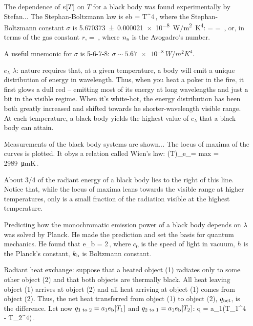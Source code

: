 The dependence of $e\!\left[{T}\right]$ on $T$ for a black body was found experimentally by Stefan... The Stephan-Boltzmann law is
\beq
e\txt b = \sigma T^4\,,
\eeq
where the Stephan-Boltzmann constant $\sigma$ is \SI{5.670373(21)e-8}{W/m^2K^4}:
\beq
\sigma = \qquad{}\qquad
\dim\sigma = \,,
\eeq
or, in terms of the gas constant $r$,
\beq
\sigma = \,,
\eeq
where $n_\text{a}$ is the Avogadro's number.

A useful mnemonic for $\sigma$ is 5-6-7-8: $\sigma \sim \SI{5.67e-8}{W/m^2K^4}$.

$e_\lambda$ \vs $\lambda$: nature requires that, at a given temperature, a body will emit a unique distribution of energy in wavelength. Thus, when you heat a poker in the fire, it first glows a dull red -- emitting most of its energy at long wavelengths and just a bit in the visible regime. When it's white-hot, the energy distribution has been both greatly increased and shifted towards he shorter-wavelength visible range. At each temperature, a black body yields the highest value of $e_\lambda$ that a black body can attain.

Measurements of the black body systems are shown... The locus of maxima of the curves is plotted. It obys a relation called Wien's law:
\beq
(\lambda T)_{e_\lambda = max} = \SI{2989}{\micro mK}\,.
\eeq

About 3/4 of the radiant energy of a black body lies to the right of this line. Notice that, while the locus of maxima leans towards the visible range at higher temperatures, only is a small fraction of the radiation visible at the highest temperature.

Predicting how the monochromatic emission power of a black body depends on $\lambda$ was solved by Planck. He made the prediction and set the basis for quantum mechanics. He found that
\beq
e_{\lambda\txt b} = 2\pi{}\,,
\eeq
where $c_0$ is the speed of light in vacuum, $h$ is the Planck's constant, $k_\text{b}$ is Boltzmann constant.

Radiant heat exchange: suppose that a heated object (1) radiates only to some other object (2) and that both objects are thermally black. All heat leaving object (1) arrives at object (2) and all heat arriving at object (1) comes from object (2). Thus, the net heat transferred from object (1) to object (2), $q_\text{net}$, is the difference. Let now $q_\text{1 to 2} = a_1e_\text{b}\!\left[{T_1}\right]$ and $q_\text{2 to 1} = a_1e_\text{b}\!\left[{T_2}\right]$:
\beq
q = a_1\sigma\left(T_1^4 - T_2^4\right)\,.
\eeq

